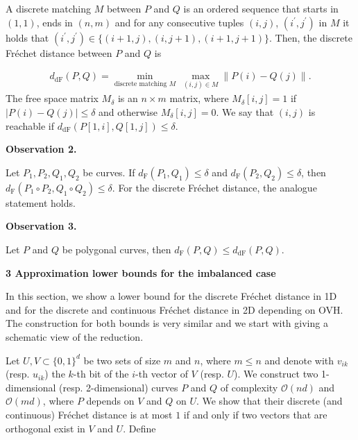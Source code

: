 \documentclass[10pt,a4paper]{article}
\begin{document}
\par
\par
A discrete matching $M$ between $P$ and $Q$ is an ordered sequence that starts in $(1,1)$, ends in $(n,m)$ and for any consecutive tuples $(i,j)$, $(i^{\prime},j^{\prime})$ in $M$ it holds that $(i^{\prime},j^{\prime})\in\{(i+1,j),(i,j+1),(i+1,j+1)\}$. Then, the discrete Fréchet distance between $P$ and $Q$ is
\par
\[\begin{aligned}
d_{\text{dF}}(P,Q)=\min_{\text{discrete matching }M}\ \max_{(i,j)\in M}\|P(i)-%
Q(j)\|.
\end{aligned}\]
The free space matrix $M_{\delta}$ is an $n\times m$ matrix, where $M_{\delta}[i,j]=1$ if $|P(i)-Q(j)|\leq\delta$ and otherwise $M_{\delta}[i,j]=0$. We say that $(i,j)$ is reachable if $d_{\text{dF}}(P[1,i],Q[1,j])\leq\delta$.
\par
\par
\par\medskip\noindent\textbf{Observation 2.}\par
Let $P_{1},P_{2},Q_{1},Q_{2}$ be curves. If $d_{\text{F}}(P_{1},Q_{1})\leq\delta$ and $d_{\text{F}}(P_{2},Q_{2})\leq\delta$, then ${d_{\text{F}}(P_{1}\circ P_{2},Q_{1}\circ Q_{2})\leq\delta}$. For the discrete Fréchet distance, the analogue statement holds.
\par
\par
\par
\par\medskip\noindent\textbf{Observation 3.}\par
Let $P$ and $Q$ be polygonal curves, then $d_{\text{F}}(P,Q)\leq d_{\text{dF}}(P,Q)$.
\par
\par
\par
\par\medskip\noindent\textbf{3 Approximation lower bounds for the imbalanced case}\par
In this section, we show a lower bound for the discrete Fréchet distance in 1D and for the discrete and continuous Fréchet distance in 2D depending on OVH. The construction for both bounds is very similar and we start with giving a schematic view of the reduction.
\par
\par
Let $U,V\subset\{0,1\}^{d}$ be two sets of size $m$ and $n$, where $m\leq n$ and denote with $v_{ik}$ (resp. $u_{ik}$) the $k$-th bit of the $i$-th vector of $V$ (resp. $U$). We construct two 1-dimensional (resp. 2-dimensional) curves $P$ and $Q$ of complexity $\mathcal{O}(nd)$ and $\mathcal{O}(md)$, where $P$ depends on $V$ and $Q$ on $U$. We show that their discrete (and continuous) Fréchet distance is at most $1$ if and only if two vectors that are orthogonal exist in $V$ and $U$. Define
\end{document}
